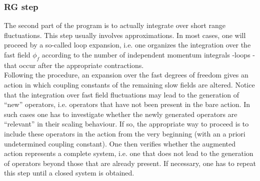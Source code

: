 \subsubsection{RG step}
The second part of the program is to actually integrate over short range fluctuations. This step usually involves approximations. 
In most cases, one will proceed by a so-called loop expansion, i.e. one organizes the integration over the fast field $\phi_f$ according to the number of independent momentum integrals -loops - that occur after the appropriate contractions.
\\
Following the procedure, an expansion over the fast degrees of freedom gives an action in which coupling constants of the remaining slow fields are altered. 
Notice that the integration over fast field fluctuations may  lead to the generation of ``new'' operators, i.e. operators that have not been present in the bare action. In such cases one has to investigate whether the newly generated operators are ``relevant'' in their scaling behaviour. 
If so, the appropriate way to proceed is to include these operators in the action from the very beginning (with an a priori undetermined coupling constant). One then verifies whether the augmented action represents a complete system, i.e. one that does not lead to the generation of operators beyond those that are already present. If necessary, one has to repeat this step until a closed system is obtained.

